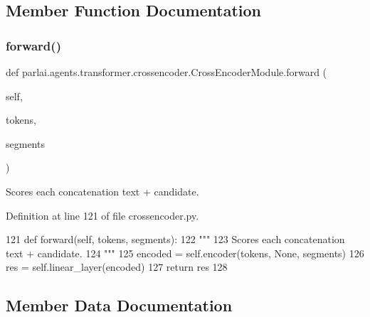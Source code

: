 \subsection{Member Function Documentation}
\mbox{\label{classparlai_1_1agents_1_1transformer_1_1crossencoder_1_1CrossEncoderModule_a86a9cf18bddebb5a1ee9c4096cfe7c20}} 
\subsubsection{\texorpdfstring{forward()}{forward()}}
{\footnotesize\ttfamily def parlai.\+agents.\+transformer.\+crossencoder.\+Cross\+Encoder\+Module.\+forward (\begin{DoxyParamCaption}\item[{}]{self,  }\item[{}]{tokens,  }\item[{}]{segments }\end{DoxyParamCaption})}

\begin{DoxyVerb}Scores each concatenation text + candidate.
\end{DoxyVerb}
 

Definition at line 121 of file crossencoder.\+py.


\begin{DoxyCode}
121     \textcolor{keyword}{def }forward(self, tokens, segments):
122         \textcolor{stringliteral}{"""}
123 \textcolor{stringliteral}{        Scores each concatenation text + candidate.}
124 \textcolor{stringliteral}{        """}
125         encoded = self.encoder(tokens, \textcolor{keywordtype}{None}, segments)
126         res = self.linear\_layer(encoded)
127         \textcolor{keywordflow}{return} res
128 \end{DoxyCode}


\subsection{Member Data Documentation}
\mbox{\label{classparlai_1_1agents_1_1transformer_1_1crossencoder_1_1CrossEncoderModule_a7b3493099f48331b36c465cc393b5145}} 

